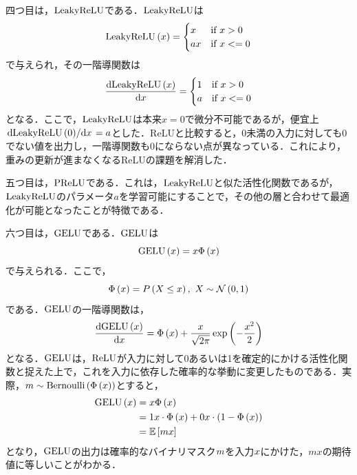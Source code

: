 \documentclass[12pt]{jarticle}
\numberwithin{equation}{section}    %
\numberwithin{figure}{section}      %
\numberwithin{table}{section}      %
\begin{document}
四つ目は，$\text{LeakyReLU}$\cite{maas2013rectifier}である．$\text{LeakyReLU}$は
\begin{equation}
    \text{LeakyReLU}\left(x\right) =
    \begin{cases}
        x  & \text{if $x > 0$}  \\
        ax & \text{if $x <= 0$}
    \end{cases}
\end{equation}
で与えられ，その一階導関数は
\begin{equation}
    \dv{\text{LeakyReLU}\left(x\right)}{x} =
    \begin{cases}
        1 & \text{if $x > 0$}  \\
        a & \text{if $x <= 0$}
    \end{cases}
\end{equation}
となる．ここで，$\text{LeakyReLU}$は本来$x = 0$で微分不可能であるが，便宜上$\dv*{\text{LeakyReLU}\left(0\right)}{x} = a$とした．ReLUと比較すると，0未満の入力に対しても0でない値を出力し，一階導関数も0にならない点が異なっている．これにより，重みの更新が進まなくなるReLUの課題を解消した．

五つ目は，$\text{PReLU}$\cite{he2015delving}である．これは，$\text{LeakyReLU}$と似た活性化関数であるが，$\text{LeakyReLU}$のパラメータ$a$を学習可能にすることで，その他の層と合わせて最適化が可能となったことが特徴である．

六つ目は，$\text{GELU}$\cite{hendrycks2016gaussian}である．$\text{GELU}$は
\begin{equation}
    \text{GELU}\left(x\right) = x \Phi\left(x\right)
\end{equation}
で与えられる．ここで，
\begin{equation}
    \Phi\left(x\right) = P\left(X \le x\right), ~ X \sim \mathcal{N} \left(0, 1\right)
\end{equation}
である．$\text{GELU}$の一階導関数は，
\begin{equation}
    \dv{\text{GELU}\left(x\right)}{x} = \Phi\left(x\right) + \frac{x}{\sqrt{2\pi}}\exp\left(-\frac{x^{2}}{2}\right)
\end{equation}
となる．$\text{GELU}$は，$\text{ReLU}$が入力に対して0あるいは1を確定的にかける活性化関数と捉えた上で，これを入力に依存した確率的な挙動に変更したものである．実際，$m \sim \text{Bernoulli}\left(\Phi\left(x\right)\right)$とすると，
\begin{align}
    \text{GELU}\left(x\right) & = x \Phi\left(x\right)                                                             \\
                          & = 1 x \cdot \Phi\left(x\right) + 0 x \cdot \left(1 - \Phi\left(x\right)\right) \\
                          & = \mathbb{E} \left[mx\right]
\end{align}
となり，$\text{GELU}$の出力は確率的なバイナリマスク$m$を入力$x$にかけた，$mx$の期待値に等しいことがわかる．
\end{document}
